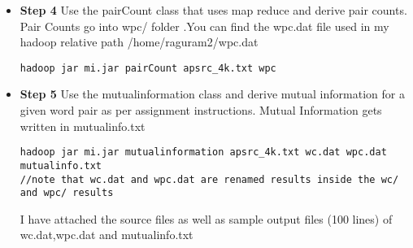 \documentclass[12pt]{article}
\theoremstyle{definition}
\begin{document}
\begin{solution}
\begin{itemize}
\item {\bf Step 4}
\newline Use the pairCount class that uses map reduce and derive pair counts. Pair Counts go into wpc/ folder .You can find the wpc.dat file used in my hadoop relative path /home/raguram2/wpc.dat
\begin{verbatim}
hadoop jar mi.jar pairCount apsrc_4k.txt wpc
\end{verbatim}
\item {\bf Step 5}
\newline Use the mutualinformation class and derive mutual information for a given word pair as per assignment instructions. Mutual Information gets written in mutualinfo.txt
\begin{verbatim}
hadoop jar mi.jar mutualinformation apsrc_4k.txt wc.dat wpc.dat mutualinfo.txt
//note that wc.dat and wpc.dat are renamed results inside the wc/ and wpc/ results
\end{verbatim}

I have attached the source files as well as sample output files (100 lines) of wc.dat,wpc.dat and mutualinfo.txt



\end{itemize}

\end{solution}
\end{document}
